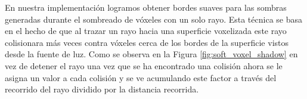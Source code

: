 En nuestra implementación logramos obtener bordes suaves para las sombras generadas durante el sombreado de vóxeles con un solo rayo. Esta técnica se basa en el hecho de que al trazar un rayo hacia una superficie voxelizada este rayo colisionara más veces contra vóxeles cerca de los bordes de la superficie vistos desde la fuente de luz. Como se observa en la Figura \ref{fig:soft_voxel_shadow} en vez de detener el rayo una vez que se ha encontrado una colisión ahora se le asigna un valor a cada colisión y se ve acumulando este factor a través del recorrido del rayo dividido por la distancia recorrida.


